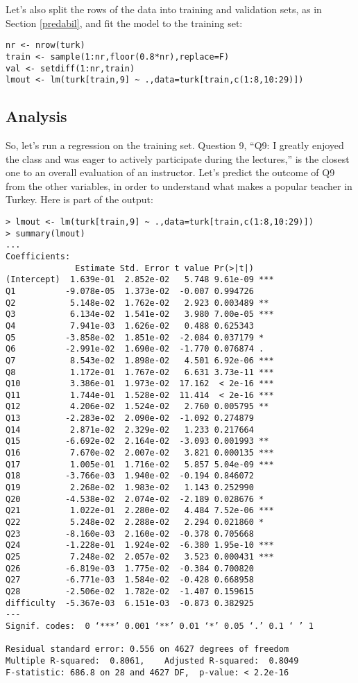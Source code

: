 Let's also split the rows of the data into training and validation sets, as
in Section \ref{predabil}, and fit the model to the training set:

\begin{lstlisting}
nr <- nrow(turk)
train <- sample(1:nr,floor(0.8*nr),replace=F)
val <- setdiff(1:nr,train)
lmout <- lm(turk[train,9] ~ .,data=turk[train,c(1:8,10:29)])
\end{lstlisting}

\subsection{Analysis}

So, let's run a regression on the training set.  Question 9, ``Q9:  I
greatly enjoyed the class and was eager to actively participate during
the lectures,'' is the closest one to an overall evaluation of an
instructor.  Let's predict the outcome of Q9 from the other variables,
in order to understand what makes a popular teacher in Turkey.  Here is
part of the output:

\begin{lstlisting}
> lmout <- lm(turk[train,9] ~ .,data=turk[train,c(1:8,10:29)])
> summary(lmout)
...
Coefficients:
              Estimate Std. Error t value Pr(>|t|)    
(Intercept)  1.639e-01  2.852e-02   5.748 9.61e-09 ***
Q1          -9.078e-05  1.373e-02  -0.007 0.994726    
Q2           5.148e-02  1.762e-02   2.923 0.003489 ** 
Q3           6.134e-02  1.541e-02   3.980 7.00e-05 ***
Q4           7.941e-03  1.626e-02   0.488 0.625343    
Q5          -3.858e-02  1.851e-02  -2.084 0.037179 *  
Q6          -2.991e-02  1.690e-02  -1.770 0.076874 .  
Q7           8.543e-02  1.898e-02   4.501 6.92e-06 ***
Q8           1.172e-01  1.767e-02   6.631 3.73e-11 ***
Q10          3.386e-01  1.973e-02  17.162  < 2e-16 ***
Q11          1.744e-01  1.528e-02  11.414  < 2e-16 ***
Q12          4.206e-02  1.524e-02   2.760 0.005795 ** 
Q13         -2.283e-02  2.090e-02  -1.092 0.274879    
Q14          2.871e-02  2.329e-02   1.233 0.217664    
Q15         -6.692e-02  2.164e-02  -3.093 0.001993 ** 
Q16          7.670e-02  2.007e-02   3.821 0.000135 ***
Q17          1.005e-01  1.716e-02   5.857 5.04e-09 ***
Q18         -3.766e-03  1.940e-02  -0.194 0.846072    
Q19          2.268e-02  1.983e-02   1.143 0.252990    
Q20         -4.538e-02  2.074e-02  -2.189 0.028676 *  
Q21          1.022e-01  2.280e-02   4.484 7.52e-06 ***
Q22          5.248e-02  2.288e-02   2.294 0.021860 *  
Q23         -8.160e-03  2.160e-02  -0.378 0.705668    
Q24         -1.228e-01  1.924e-02  -6.380 1.95e-10 ***
Q25          7.248e-02  2.057e-02   3.523 0.000431 ***
Q26         -6.819e-03  1.775e-02  -0.384 0.700820    
Q27         -6.771e-03  1.584e-02  -0.428 0.668958    
Q28         -2.506e-02  1.782e-02  -1.407 0.159615    
difficulty  -5.367e-03  6.151e-03  -0.873 0.382925    
---
Signif. codes:  0 ‘***’ 0.001 ‘**’ 0.01 ‘*’ 0.05 ‘.’ 0.1 ‘ ’ 1

Residual standard error: 0.556 on 4627 degrees of freedom
Multiple R-squared:  0.8061,    Adjusted R-squared:  0.8049 
F-statistic: 686.8 on 28 and 4627 DF,  p-value: < 2.2e-16
\end{lstlisting}

